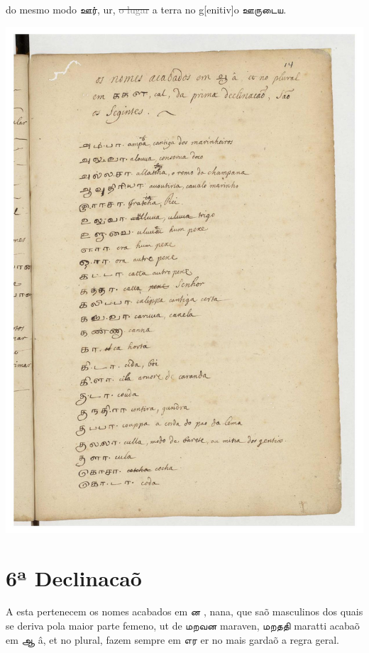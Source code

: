 \documentclass[12pt,a4paper]{scrbook}
\begin{document}
      

do mesmo modo ஊர், ur, \sout{\textcolor{gray}{ o  
  lugar}} a terra no g[enitiv]o
	ஊருடைய.
      
\newpage
\hypertarget{img-37}{
    \includegraphics[width=\textwidth]{img-37}}
\newpage
      \chapter*{6ª Declinacaõ}
    
      

 A esta pertenecem os nomes acabados em ன , nana, que saõ masculinos dos quais se
             deriva pola maior parte femeno, ut de மறவன maraven, மறததி maratti acabaõ em ஆ 
            â, et no plural, fazem sempre em எர er no mais gardaõ a regra geral.
        
\end{document}
